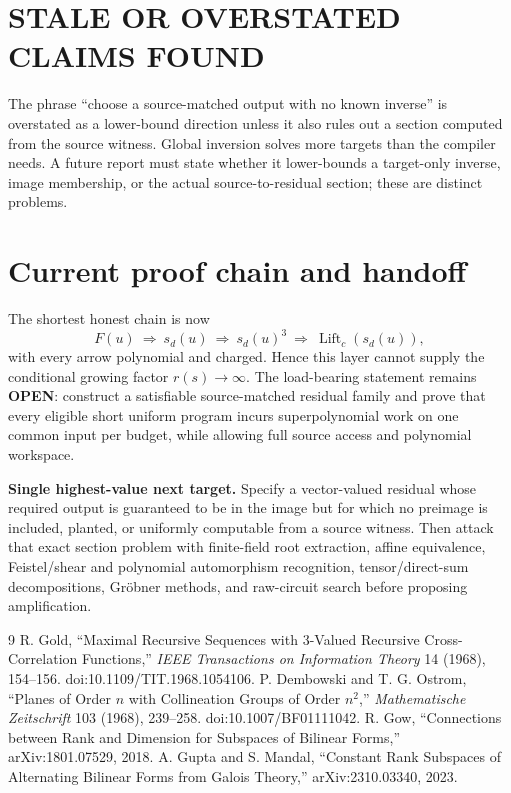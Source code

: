 \documentclass[11pt]{article}
\newcommand{\OPEN}{\textbf{OPEN}}
\begin{document}
\section{STALE OR OVERSTATED CLAIMS FOUND}
The phrase ``choose a source-matched output with no known inverse'' is
overstated as a lower-bound direction unless it also rules out a section
computed from the source witness.  Global inversion solves more targets than
the compiler needs.  A future report must state whether it lower-bounds a
target-only inverse, image membership, or the actual source-to-residual
section; these are distinct problems.

\section{Current proof chain and handoff}
The shortest honest chain is now
\[
F(u)\ \Longrightarrow\ s_d(u)\ \Longrightarrow\
s_d(u)^3\ \Longrightarrow\ \operatorname{Lift}_c(s_d(u)),
\]
with every arrow polynomial and charged.  Hence this layer cannot supply the
conditional growing factor $r(s)\to\infty$.  The load-bearing statement
remains \OPEN{}: construct a satisfiable source-matched residual family and
prove that every eligible short uniform program incurs superpolynomial work
on one common input per budget, while allowing full source access and
polynomial workspace.

\textbf{Single highest-value next target.}
Specify a vector-valued residual whose required output is guaranteed to be in
the image but for which no preimage is included, planted, or uniformly
computable from a source witness.  Then attack that exact section problem with
finite-field root extraction, affine equivalence, Feistel/shear and polynomial
automorphism recognition, tensor/direct-sum decompositions, Gröbner methods,
and raw-circuit search before proposing amplification.

\begin{thebibliography}{9}
R. Gold, ``Maximal Recursive Sequences with 3-Valued Recursive
Cross-Correlation Functions,'' \emph{IEEE Transactions on Information
Theory} 14 (1968), 154--156.  doi:10.1109/TIT.1968.1054106.
P. Dembowski and T. G. Ostrom, ``Planes of Order $n$ with Collineation Groups
of Order $n^2$,'' \emph{Mathematische Zeitschrift} 103 (1968), 239--258.
doi:10.1007/BF01111042.
R. Gow, ``Connections between Rank and Dimension for Subspaces of Bilinear
Forms,'' arXiv:1801.07529, 2018.
A. Gupta and S. Mandal, ``Constant Rank Subspaces of Alternating Bilinear
Forms from Galois Theory,'' arXiv:2310.03340, 2023.
\end{thebibliography}
\end{document}
